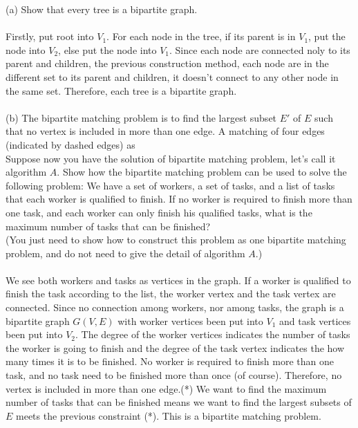 \documentclass[10.5pt]{article}
\begin{document}
(a) Show that every tree is a bipartite graph.\\
\\
Firstly, put root into $V_1$. For each node in the tree, if its parent is in $V_1$, put the node into $V_2$, else put the node into $V_1$. Since each node are connected noly to its parent and children, the previous construction method, each node are in the different set to its parent and children, it doesn't connect to any other node in the same set. Therefore, each tree is a bipartite graph.\\
\\
(b) The bipartite matching problem is to find the largest subset $E'$ of $E$ such that no vertex is
included in more than one edge. A matching of four edges (indicated by dashed edges) as
\\
Suppose now you have the solution of bipartite matching problem, let's call it algorithm $A$. Show how the bipartite matching problem can be used to solve the following problem: We have
a set of workers, a set of tasks, and a list of tasks that each worker is qualified to finish.
If no worker is required to finish more than one task, and each worker can only finish his qualified tasks, what is the maximum number of tasks that can be finished?\\
(You just need to show how to construct this problem as one bipartite matching problem, and do not need to give the detail of algorithm $A$.)\\
\\
We see both workers and tasks as vertices in the graph. If a worker is qualified to finish the task according to the list, the worker vertex and the task vertex are connected. Since no connection among workers, nor among tasks, the graph is a bipartite graph $G(V, E)$ with worker vertices been put into $V_1$ and task vertices been put into $V_2$. The degree of the worker vertices indicates the number of tasks the worker is going to finish and the degree of the task vertex indicates the how many times it is to be finished. No worker is required to finish more than one task, and no task need to be finished more than once (of course). Therefore, no vertex is included in more than one edge.(*) We want to find the maximum number of tasks that can be finished means we want to find the largest subsets of $E$ meets the previous constraint (*). This is a bipartite matching problem.\\
\pagebreak
\end{document}
